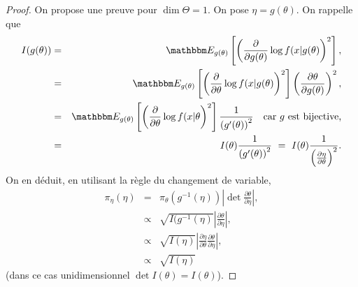 \begin{proof} %
On propose une preuve pour $\dim\Theta=1$. On pose $\eta=g(\theta)$. On rappelle que
\begin{eqnarray*}
I(g(\theta)) & = & \E_{g(\theta)}\left[\left(\frac{\partial}{\partial g(\theta)}\log f(x|g(\theta)\right)^2\right], \\
& = & \E_{g(\theta)}\left[\left(\frac{\partial}{\partial \theta}\log f(x|g(\theta)\right)^2\right] \left(\frac{\partial \theta}{\partial g(\theta)}\right)^2, \\
& = & \E_{g(\theta)}\left[\left(\frac{\partial}{\partial \theta}\log f(x|\theta\right)^2\right] \frac{1}{\left(g'(\theta)\right)^2} \ \ \ \text{car $g$ est bijective,} \\
& = & I(\theta)  \frac{1}{\left(g'(\theta)\right)^2} \ = \ I(\theta)  \frac{1}{\left(\frac{\partial \eta}{\partial \theta}\right)^2}.
\end{eqnarray*}
On en déduit, en utilisant la règle du changement de variable, 
\begin{eqnarray*}
\pi_{\eta}(\eta) & = & \pi_{\theta}\left(g^{-1}(\eta)\right) \left| \det \frac{\partial \theta}{\partial \eta}\right|, \\
& \propto & \sqrt{I(g^{-1}(\eta)} \left|  \frac{\partial \theta}{\partial \eta}\right|, \\
& \propto & \sqrt{I(\eta)} \left| \frac{\partial \eta}{\partial \theta} \frac{\partial \theta}{\partial \eta}\right|, \\
& \propto & \sqrt{I(\eta)}
\end{eqnarray*}
(dans ce cas unidimensionnel $\det I(\theta)=I(\theta)$).
\end{proof}